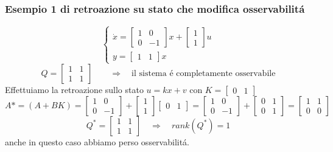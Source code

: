 \documentclass[../main.tex]{subfiles}
\begin{document}
	\subsubsection{Esempio 1 di retroazione su stato che modifica osservabilit\'a}
		\[
			\begin{cases}
				\dot x =
				\begin{bmatrix}
					1 & 0\\
					0 & -1
				\end{bmatrix} x +
				\begin{bmatrix}
					1\\
					1
				\end{bmatrix} u
				\\
				y =
				\begin{bmatrix}
					1 & 1
				\end{bmatrix} x
			\end{cases}
		\]
		\[
			Q =
			\begin{bmatrix}
				1 & 1\\
				1 & 1
			\end{bmatrix}
			\qquad\Rightarrow\quad\text{il sistema \'e completamente osservabile}
		\]
		Effettuiamo la retroazione sullo stato $ u = kx + v $ con $ K = \left[ \begin{smallmatrix} 0 & 1 \end{smallmatrix} \right] $
		\[
			A* = (A+BK) =
			\begin{bmatrix}
				1 & 0\\
				0 & -1
			\end{bmatrix} +
			\begin{bmatrix}
				1\\
				1
			\end{bmatrix}
			\begin{bmatrix}
				0 & 1
			\end{bmatrix} =
			\begin{bmatrix}
				1 & 0\\
				0 & -1
			\end{bmatrix} +
			\begin{bmatrix}
				0 & 1\\
				0 & 1
			\end{bmatrix} =
			\begin{bmatrix}
				1 & 1\\
				0 & 0
			\end{bmatrix}
		\]
		\[
			Q^{*} =
			\begin{bmatrix}
				1 & 1\\
				1 & 1
			\end{bmatrix}
			\quad\Rightarrow\quad rank(Q^{*}) = 1 
		\]
		anche in questo caso abbiamo perso osservabilit\'a.
		
\end{document}
